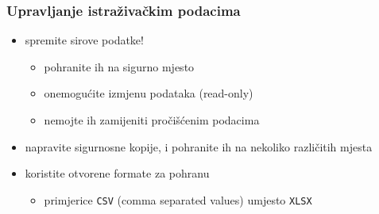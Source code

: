 \documentclass[aspectratio=169]{beamer}
\newenvironment{noheadline}{
    \setbeamertemplate{headline}{}
}{}
\begin{document}
\begin{noheadline}
    \begin{frame}
        \frametitle{Upravljanje istraživačkim podacima}

        \begin{itemize}
            \setlength{\itemsep}{2em}

            \item spremite sirove podatke!

            \begin{itemize}
                \item pohranite ih na sigurno mjesto

                \item onemogućite izmjenu podataka (read-only)

                \item nemojte ih zamijeniti pročišćenim podacima
            \end{itemize}

            \pause

            \item napravite sigurnosne kopije, i pohranite ih na nekoliko
                različitih mjesta

            \pause

            \item koristite otvorene formate za pohranu

            \begin{itemize}
                \item primjerice \texttt{CSV} (comma separated values) umjesto
                    \texttt{XLSX}
            \end{itemize}
        \end{itemize}
    \end{frame}
\end{noheadline}
\end{document}
